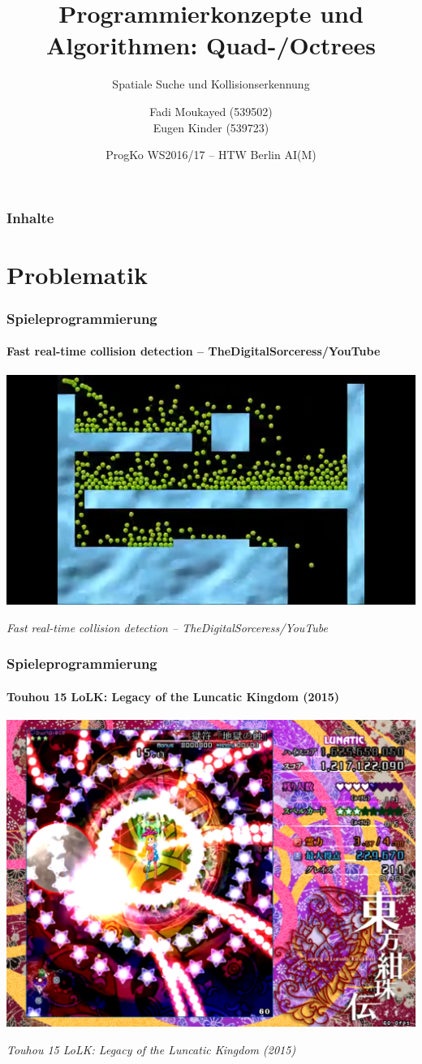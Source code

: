 \documentclass{beamer}
\title[Quadtrees]
{Programmierkonzepte und Algorithmen: Quad-/Octrees}
\subtitle{Spatiale Suche und Kollisionserkennung}
\author[Moukayed, Kinder]
{Fadi Moukayed (539502) \\ Eugen Kinder (539723)}
\date[ProgKo WS2016/17]
{ProgKo WS2016/17 -- HTW Berlin AI(M)}
\begin{document}
  
\frame{\titlepage}
\begin{frame}
  \frametitle{Inhalte}
  \tableofcontents
\end{frame}

\section{Problematik}

\begin{frame}
  \frametitle{Spieleprogrammierung}
  \framesubtitle{Fast real-time collision detection -- TheDigitalSorceress/YouTube}
  \begin{center}
    \includegraphics[scale=0.5]{rsrc/greencirc}
    
    \tiny \it Fast real-time collision detection -- TheDigitalSorceress/YouTube
  \end{center}
\end{frame}

\begin{frame}
  \frametitle{Spieleprogrammierung}
  \framesubtitle{Touhou 15 LoLK: Legacy of the Luncatic Kingdom (2015)}
  \begin{center}
    \includegraphics[scale=0.20]{rsrc/touhou}
    
    \tiny \it Touhou 15 LoLK: Legacy of the Luncatic Kingdom (2015)
  \end{center}
\end{frame}
\end{document}
